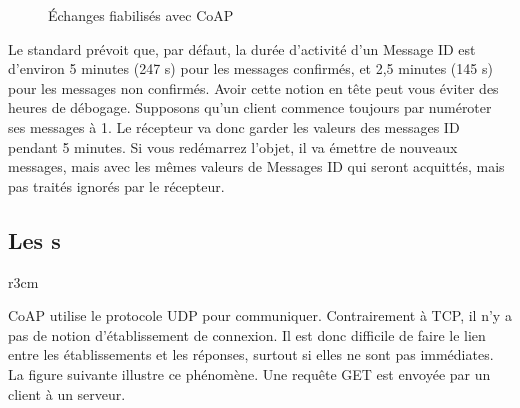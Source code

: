 \begin{figure}
\caption{Échanges fiabilisés avec CoAP} 
\label{fig-duree-max} 
\end{figure} 	

         \vspace{1em}

Le standard prévoit que, par défaut, la durée d’activité d’un Message ID est d’environ 5 minutes (247 s) pour les messages confirmés, et 2,5 minutes (145 s) pour les messages non confirmés.
Avoir cette notion en tête peut vous éviter des heures de débogage. Supposons qu'un client commence toujours par numéroter ses messages à 1. Le récepteur va donc garder les valeurs des messages ID pendant 5 minutes. Si vous redémarrez l'objet, il va émettre de nouveaux messages, mais avec les mêmes valeurs de Messages ID qui seront acquittés, mais pas traités ignorés par le récepteur.



\subsection{Les s}\label{chap-token}

\begin{wrapfigure}{r}{3cm}
\end{wrapfigure}

CoAP utilise le protocole UDP pour communiquer. Contrairement à TCP, il n’y a pas de notion d’établissement de connexion. Il est donc difficile de faire le lien entre les établissements et les réponses, surtout si elles ne sont pas immédiates. La figure suivante illustre ce phénomène. Une requête GET est envoyée par un client à un serveur.

